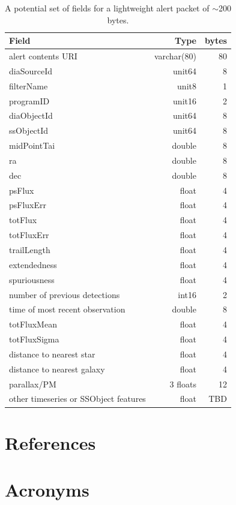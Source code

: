\documentclass[DM,authoryear,toc]{lsstdoc}
\begin{document}
\begin{table}
  \begin{centering}
  \begin{tabular}{|l|r|r|}
    \hline
Field	& Type &	bytes \\
\hline
alert contents URI &	varchar(80)	& 80 \\
diaSourceId	&  unit64	& 8 \\
filterName &  	unit8	& 1 \\
programID	& unit16	& 2 \\
diaObjectId	& unit64 &	8 \\
ssObjectId &	unit64 &	8 \\
midPointTai &	double &	8 \\
ra &	double & 	8 \\
dec &	double & 	8 \\
psFlux &	float	& 4 \\
psFluxErr &	float	& 4 \\
totFlux	 & float &	4 \\
totFluxErr & 	float	& 4 \\
trailLength	& float	& 4 \\
extendedness & 	float & 	4 \\
spuriousness &	float	& 4 \\
number of previous detections	& int16	& 2 \\
time of most recent observation & 	double & 	8 \\
totFluxMean	& float	& 4 \\
totFluxSigma & 	float	& 4 \\
distance to nearest star & 	float	& 4 \\
distance to nearest galaxy	& float	& 4 \\
parallax/PM	& 3 floats &	12 \\
other timeseries or SSObject features & float & TBD \\
\hline
  \end{tabular}
  \caption{A potential set of fields for a lightweight alert packet of $\sim$200 bytes. \label{tab:lightweight_alert}}
\end{centering}
\end{table}


\section{References} \label{sec:bib}
\renewcommand{\refname}{} %


\section{Acronyms} \label{sec:acronyms}

\end{document}
